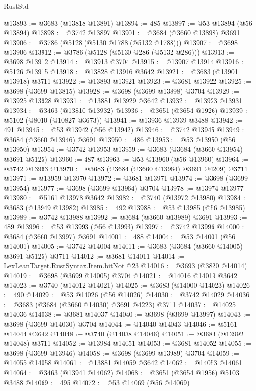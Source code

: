 \begin{lexlean}{RustStd}
\begin{coremodule}
@13893 := @3683 (@13818 @13891)
@13894 := 485
@13897 := @53 @13894 (@56 @13894)
@13898 := @3742 @13897
@13901 := @3684 (@3660 @13898) @3691
@13906 := @3786 (@5128 (@5130 @1788 (@5132 @1788)))
@13907 := @3698 @13906
@13912 := @3786 (@5128 (@5130 @286 (@5132 @286)))
@13913 := @3698 @13912
@13914 := @13913 @3704
@13915 := @13907 @13914
@13916 := @5126 @13915
@13918 := @13828 @13916 @3642
@13921 := @3683 (@13901 @13918) @3711
@13922 := @13893 @13921
@13923 := @3681 @13922
@13925 := @3698 (@3699 @13815)
@13928 := @3698 (@3699 @13898) @3704
@13929 := @13925 @13928
@13931 := @13881 @13929 @3642
@13932 := @13923 @13931
@13934 := @3463 (@13810 @13932)
@13936 := @3651 (@3654 @1926)
@13939 := @5102 (@8010 (@10827 @3673))
@13941 := @13936 @13939 @3488
@13942 := 491
@13945 := @53 @13942 (@56 @13942)
@13946 := @3742 @13945
@13949 := @3684 (@3660 @13946) @3691
@13950 := 486
@13953 := @53 @13950 (@56 @13950)
@13954 := @3742 @13953
@13959 := @3683 (@3684 (@3660 @13954) @3691 @5125)
@13960 := 487
@13963 := @53 @13960 (@56 @13960)
@13964 := @3742 @13963
@13970 := @3683 (@3684 (@3660 @13964) @3691 @4209) @3711
@13971 := @13959 @13970
@13972 := @3681 @13971
@13974 := @3698 (@3699 @13954)
@13977 := @3698 (@3699 @13964) @3704
@13978 := @13974 @13977
@13980 := @5161 @13978 @3642
@13982 := @3740 (@13972 @13980)
@13984 := @3683 (@13949 @13982)
@13985 := 492
@13988 := @53 @13985 (@56 @13985)
@13989 := @3742 @13988
@13992 := @3684 (@3660 @13989) @3691
@13993 := 489
@13996 := @53 @13993 (@56 @13993)
@13997 := @3742 @13996
@14000 := @3684 (@3660 @13997) @3691
@14001 := 488
@14004 := @53 @14001 (@56 @14001)
@14005 := @3742 @14004
@14011 := @3683 (@3684 (@3660 @14005) @3691 @5125) @3711
@14012 := @3681 @14011
@14014 := LexLeanTarget.RustSyntax.Item.bitNot @23
@14016 := @3693 (@3820 @14014)
@14019 := @3698 (@3699 @14005) @3704
@14021 := @14016 @14019 @3642
@14023 := @3740 (@14012 @14021)
@14025 := @3683 (@14000 @14023)
@14026 := 490
@14029 := @53 @14026 (@56 @14026)
@14030 := @3742 @14029
@14036 := @3683 (@3684 (@3660 @14030) @3691 @4223) @3711
@14037 := @14025 @14036
@14038 := @3681 @14037
@14040 := @3698 (@3699 @13997)
@14043 := @3698 (@3699 @14030) @3704
@14044 := @14040 @14043
@14046 := @5161 @14044 @3642
@14048 := @3740 (@14038 @14046)
@14051 := @3683 (@13992 @14048) @3711
@14052 := @13984 @14051
@14053 := @3681 @14052
@14055 := @3698 (@3699 @13946)
@14058 := @3698 (@3699 @13989) @3704
@14059 := @14055 @14058
@14061 := @13881 @14059 @3642
@14062 := @14053 @14061
@14064 := @3463 (@13941 @14062)
@14068 := @3651 (@3654 @1956) @5103 @3488
@14069 := 495
@14072 := @53 @14069 (@56 @14069)

\end{coremodule}
\end{lexlean}

